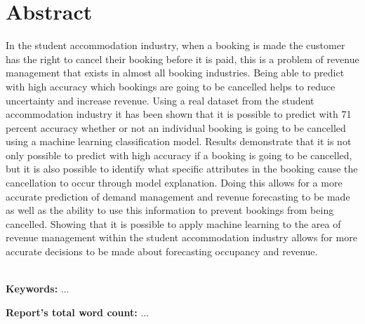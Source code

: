 \chapter*{\center \Large  Abstract}

In the student accommodation industry, when a booking is made the customer has the right to cancel their booking before it is paid, this is a problem of revenue management that exists in almost all booking industries. Being able to predict with high accuracy which bookings are going to be cancelled helps to reduce uncertainty and increase revenue. Using a real dataset from the student accommodation industry it has been shown that it is possible to predict with 71 percent accuracy whether or not an individual booking is going to be cancelled using a machine learning classification model. Results demonstrate that it is not only possible to predict with high accuracy if a booking is going to be cancelled, but it is also possible to identify what specific attributes in the booking cause the cancellation to occur through model explanation. Doing this allows for a more accurate prediction of demand management and revenue forecasting to be made as well as the ability to use this information to prevent bookings from being cancelled. Showing that it is possible to apply machine learning to the area of revenue management within the student accommodation industry allows for more accurate decisions to be made about forecasting occupancy and revenue.

~\\[1cm]
\noindent
\textbf{Keywords:} ...

\vfill
\noindent
\textbf{Report's total word count:} ...

